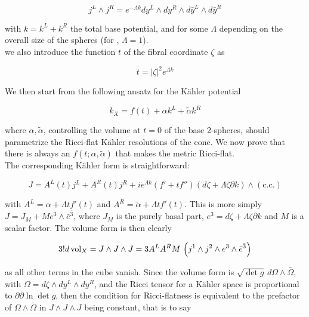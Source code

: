 \begin{equation}
	j^L \wedge j^R = e^{-\Lambda k} dy^L \wedge dy^R \wedge d\bar y^L \wedge d\bar y^R
\end{equation}

with $k = k^L + k^R$ the total base potential, and for some $\Lambda$ depending on the overall size of the spheres (for , $\Lambda = 1$).\\

we also introduce the function $t$ of the fibral coordinate $\zeta$ as 

\begin{equation}
	t = |\zeta|^2 e^{\Lambda k}
\end{equation}

We then start from the following ansatz for the K\"ahler potential

\begin{equation}
	k_X = f(t) + \alpha k^L + \tilde\alpha k^R
\end{equation}

where $\alpha,\tilde\alpha$, controlling the volume at $t=0$ of the base 2-spheres, should parametrize the Ricci-flat K\"ahler resolutions of the cone. We now prove that there is always an $f(t;\alpha,\tilde\alpha)$ that makes the metric Ricci-flat.\\

The corresponding K\"ahler form is straightforward:

\begin{equation}
	J = A^L(t) j^L + A^R(t) j^R + i e^{\Lambda k} (f' + t f'') (d\zeta + \Lambda \zeta \partial k) \wedge (\mathrm{c.c.})
\end{equation}

\newcommand{\fibral}{e^3 \wedge \bar e^{\bar 3}}

with $A^L = \alpha + \Lambda t f'(t)$ and  $A^R = \tilde\alpha + \Lambda t f'(t)$. This is more simply $J = J_M + M \fibral$, where $J_M$ is the purely basal part, $e^3 = d\zeta + \Lambda \zeta \partial k$ and $M$ is a scalar factor. The volume form is then clearly

\begin{equation}
	3! d\vol_X = J \wedge J \wedge J = 3 A^L A^R M \, \left( j^1 \wedge j^2 \wedge \fibral \right)
\end{equation}

as all other terms in the cube vanish. Since the volume form is $\sqrt{\det g} \, d\Omega \wedge \bar \Omega$, with $\Omega = d\zeta \wedge dy^L \wedge dy^R$, and the Ricci tensor for a K\"ahler space is proportional to $\partial \bar \partial \ln \det g$, then the condition for Ricci-flatness is equivalent to the prefactor of $\Omega \wedge \bar \Omega$ in $J\wedge J \wedge J$ being constant, that is to say

